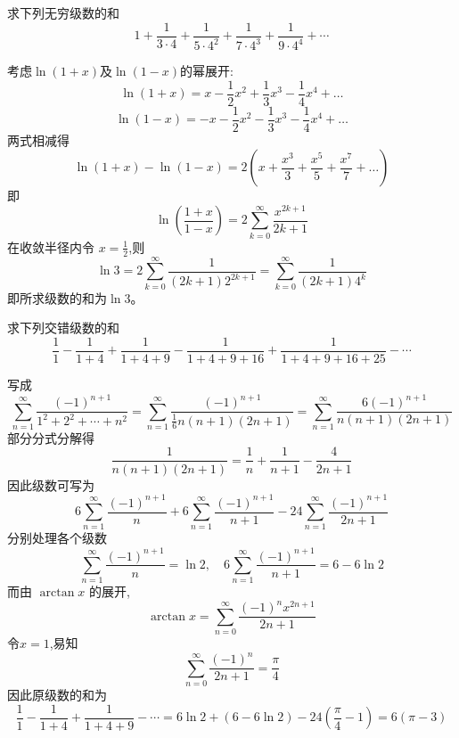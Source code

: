 \begin{questions}
    \question 求下列无穷级数的和
    \[
    1+\frac{1}{3\cdot4}+\frac{1}{5\cdot4^2}+\frac{1}{7\cdot4^3}+\frac{1}{9\cdot4^4}+\cdots
    \]
    \begin{solution}
        考虑$\ln(1+x)$及$\ln(1-x)$的幂展开:
        \[
        \ln(1+x) = x - \frac{1}{2}x^2 + \frac{1}{3}x^3 - \frac{1}{4}x^4 + \dots
        \]
        \[
        \ln(1-x) = -x - \frac{1}{2}x^2 - \frac{1}{3}x^3 - \frac{1}{4}x^4 + \dots
        \]
        两式相减得
        \[
        \ln(1+x) - \ln(1-x) = 2\left( x + \frac{x^3}{3} + \frac{x^5}{5} + \frac{x^7}{7} + \dots \right)
        \]
        即
        \[
        \ln\left(\frac{1+x}{1-x}\right) = 2 \sum_{k=0}^{\infty} \frac{x^{2k+1}}{2k+1}
        \]
        在收敛半径内令 $x = \frac{1}{2}$,则
        \[
        \ln 3 = 2 \sum_{k=0}^{\infty} \frac{1}{(2k+1)2^{2k+1}} = \sum_{k=0}^{\infty} \frac{1}{(2k+1)4^k}
        \]
        即所求级数的和为$\ln 3$。
    \end{solution}

    \question 求下列交错级数的和
    \[
    \frac{1}{1} - \frac{1}{1+4} + \frac{1}{1+4+9} - \frac{1}{1+4+9+16} + \frac{1}{1+4+9+16+25} - \cdots
    \]
    \begin{solution}
        写成
        \[
        \sum_{n=1}^{\infty} \frac{(-1)^{n+1}}{1^2 + 2^2 + \cdots + n^2} = \sum_{n=1}^{\infty} \frac{(-1)^{n+1}}{\frac{1}{6}n(n+1)(2n+1)} = \sum_{n=1}^{\infty} \frac{6(-1)^{n+1}}{n(n+1)(2n+1)}
        \]
        部分分式分解得
        \[
        \frac{1}{n(n+1)(2n+1)} = \frac{1}{n} + \frac{1}{n+1} - \frac{4}{2n+1}
        \]
        因此级数可写为
        \[
        6\sum_{n=1}^{\infty} \frac{(-1)^{n+1}}{n} + 6\sum_{n=1}^{\infty} \frac{(-1)^{n+1}}{n+1} - 24\sum_{n=1}^{\infty} \frac{(-1)^{n+1}}{2n+1}
        \]
        分别处理各个级数
        \[
        \sum_{n=1}^{\infty} \frac{(-1)^{n+1}}{n} = \ln 2, \quad 6\sum_{n=1}^{\infty} \frac{(-1)^{n+1}}{n+1} = 6 - 6 \ln 2
        \]
        而由 $\arctan x$ 的展开,
        \[
        \arctan x = \sum_{n=0}^{\infty} \frac{(-1)^n x^{2n+1}}{2n+1}  
        \]
        令$x=1$,易知
        \[
        \sum_{n=0}^{\infty} \frac{(-1)^n}{2n+1} = \frac{\pi}{4}
        \]
        因此原级数的和为
        \[
        \frac{1}{1} - \frac{1}{1+4} + \frac{1}{1+4+9} - \cdots = 6\ln 2 + (6 - 6\ln 2) - 24\left(\frac{\pi}{4} - 1\right) = 6(\pi - 3)
        \]
    \end{solution}


\end{questions}
